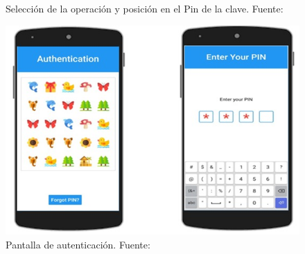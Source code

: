 \begin{anexos}
\begin{figure}[H]
\begin{minipage}[b]{0.5\linewidth}
		\caption{Selección de la operación y posición en el Pin de la clave. Fuente: \cite{kausar2022gra}  }          
	\end{minipage}
	\begin{minipage}[b]{0.4\linewidth} %
		\centering
		\includegraphics[width=\linewidth]{grapin-auth.jpg}
		\caption{Pantalla de autenticación. Fuente: \cite{kausar2022gra}}
		
	\end{minipage}
	\label{gra-pin-screens}
\end{figure}





\end{anexos}
